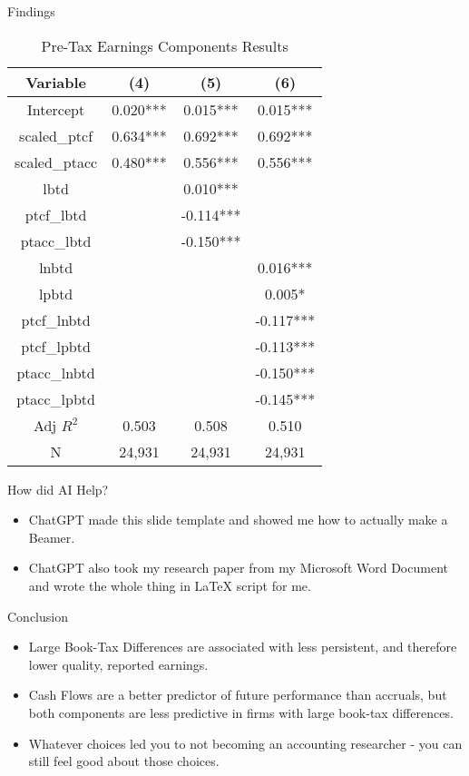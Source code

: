 \documentclass{beamer}
\begin{document}
\begin{frame}{Findings}
  \begin{table}[htbp]
\centering
\caption{Pre-Tax Earnings Components Results}
\label{tab:Models_4_6_Results}
\begin{tabular}{|c|c|c|c|}
\hline
Variable & (4) & (5) & (6) \\
\hline
Intercept & 0.020*** & 0.015*** & 0.015*** \\
scaled\_ptcf & 0.634*** & 0.692*** & 0.692*** \\
scaled\_ptacc & 0.480*** & 0.556*** & 0.556*** \\
lbtd &  & 0.010*** & \\
ptcf\_lbtd &  & -0.114*** &  \\
ptacc\_lbtd &  & -0.150*** &  \\
lnbtd &  &  & 0.016*** \\
lpbtd &  &  & 0.005* \\
ptcf\_lnbtd &  &  & -0.117*** \\
ptcf\_lpbtd &  &  & -0.113*** \\
ptacc\_lnbtd &  &  & -0.150*** \\
ptacc\_lpbtd &  &  & -0.145*** \\
\hline
Adj $R^2$ & 0.503 & 0.508 & 0.510 \\
\hline
N & 24,931 & 24,931 & 24,931 \\
\hline
\end{tabular}
\end{table}
\end{frame}

\begin{frame}{How did AI Help?}
\begin{itemize}
    \item  ChatGPT made this slide template and showed me how to actually make a Beamer.
    \item  ChatGPT also took my research paper from my Microsoft Word Document and wrote the whole thing in LaTeX script for me.
\end{itemize}
\end{frame}

\begin{frame}{Conclusion}
\begin{itemize}
    \item  Large Book-Tax Differences are associated with less persistent, and therefore lower quality, reported earnings.
    \item  Cash Flows are a better predictor of future performance than accruals, but both components are less predictive in firms with large book-tax differences.
    \item  Whatever choices led you to not becoming an accounting researcher - you can still feel good about those choices.
\end{itemize}
\end{frame}
\end{document}
